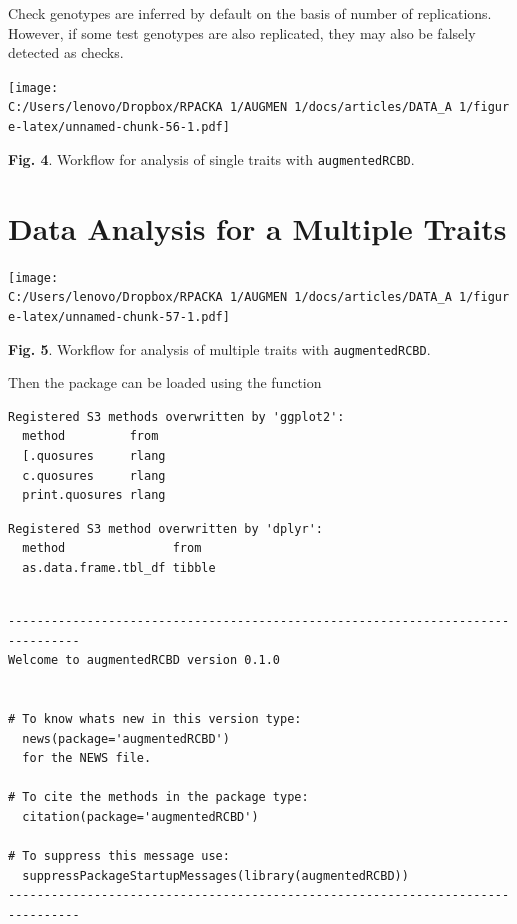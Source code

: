 Check genotypes are inferred by default on the basis of number of
replications. However, if some test genotypes are also replicated, they
may also be falsely detected as checks.

\texttt{[image: C:/Users/lenovo/Dropbox/RPACKA~1/AUGMEN~1/docs/articles/DATA\_A~1/figure-latex/unnamed-chunk-56-1.pdf]}

\textbf{Fig. 4}. Workflow for analysis of single traits with
\texttt{augmentedRCBD}.

\hypertarget{data-analysis-for-a-multiple-traits}{%
\section{Data Analysis for a Multiple
Traits}\label{data-analysis-for-a-multiple-traits}}

\texttt{[image: C:/Users/lenovo/Dropbox/RPACKA~1/AUGMEN~1/docs/articles/DATA\_A~1/figure-latex/unnamed-chunk-57-1.pdf]}

\textbf{Fig. 5}. Workflow for analysis of multiple traits with
\texttt{augmentedRCBD}.

\clearpage

Then the package can be loaded using the function

\begin{Shaded}
\begin{Highlighting}[]
\end{Highlighting}
\end{Shaded}

\begin{verbatim}
Registered S3 methods overwritten by 'ggplot2':
  method         from 
  [.quosures     rlang
  c.quosures     rlang
  print.quosures rlang
\end{verbatim}

\begin{verbatim}
Registered S3 method overwritten by 'dplyr':
  method               from  
  as.data.frame.tbl_df tibble
\end{verbatim}

\begin{verbatim}

--------------------------------------------------------------------------------
Welcome to augmentedRCBD version 0.1.0


# To know whats new in this version type:
  news(package='augmentedRCBD')
  for the NEWS file.

# To cite the methods in the package type:
  citation(package='augmentedRCBD')

# To suppress this message use:
  suppressPackageStartupMessages(library(augmentedRCBD))
--------------------------------------------------------------------------------
\end{verbatim}

